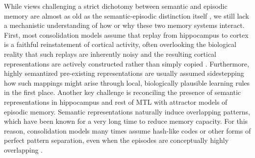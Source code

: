 \documentclass{article}
\begin{document}
\newline\newline
While views challenging a strict dichotomy between semantic and episodic memory are almost as old as the semantic-episodic distinction itself , we still lack a mechanistic understanding of how or why these two memory systems interact. First, most consolidation models assume that replay from hippocampus to cortex is a faithful reinstatement of cortical activity, often overlooking the biological reality that such replays are inherently noisy and the resulting cortical representations are actively constructed rather than simply copied . Furthermore, highly semantized pre-existing representations are usually assumed  sidestepping how such mappings might arise through local, biologically plausible learning rules in the first place. Another key challenge is reconciling the presence of semantic representations in hippocampus and rest of MTL with attractor models of episodic memory. Semantic representations naturally induce overlapping patterns, which have been known for a very long time to reduce memory capacity. For this reason, consolidation models many times assume hash-like codes or other forms of perfect pattern separation, even when the episodes are conceptually highly overlapping .
\newline\newline
\end{document}
